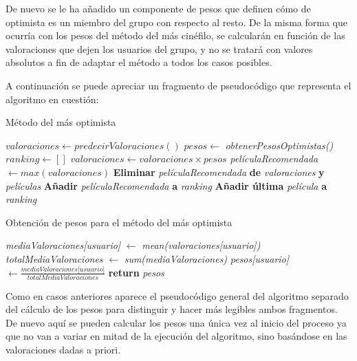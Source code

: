 De nuevo se le ha añadido un componente de pesos que definen cómo de optimista es un miembro del grupo con respecto al resto. De la misma forma que ocurría con los pesos del método del más cinéfilo, se calcularán en función de las valoraciones que dejen los usuarios del grupo, y no se tratará con valores absolutos a fin de adaptar el método a todos los casos posibles.

A continuación se puede apreciar un fragmento de pseudocódigo que representa el algoritmo en cuestión:
\newpage

\begin{algorithm}
	\caption{Método del más optimista}
	\begin{algorithmic}[1]
		\State $valoraciones \gets predecirValoraciones()$
		\State $pesos \gets $ \textit{obtenerPesosOptimistas()}
		\State $ranking \gets []$
		\State $valoraciones \gets valoraciones \times pesos$
		\State \textit{películaRecomendada} $ \gets max(valoraciones)$
		\State \textbf{Eliminar} \textit{películaRecomendada} \textbf{de} \textit{valoraciones} \textbf{y} \textit{películas}
		\State \textbf{Añadir} \textit{películaRecomendada} \textbf{a} \textit{ranking}
		\EndWhile
		\State \textbf{Añadir última} \textit{película} \textbf{a} \textit{ranking}
	\end{algorithmic}
\end{algorithm}

\begin{algorithm}
	\caption{Obtención de pesos para el método del más optimista}
	\begin{algorithmic}[1]
		\State \textit{mediaValoraciones[usuario]} $\gets$ \textit{mean(valoraciones[usuario])} 
		\EndFor
		\State \textit{totalMediaValoraciones} $\gets$ \textit{sum(mediaValoraciones)}
		\State \textit{pesos[usuario]} $\gets \frac{\textit{mediaValoraciones[usuario]}}{\textit{totalMediaValoraciones}}$
		\EndFor
		\State \textbf{return} \textit{pesos}
	\end{algorithmic}
\end{algorithm}

Como en casos anteriores aparece el pseudocódigo general del algoritmo separado del cálculo de los pesos para distinguir y hacer más legibles ambos fragmentos. De nuevo aquí se pueden calcular los pesos una única vez al inicio del proceso ya que no van a variar en mitad de la ejecución del algoritmo, sino basándose en las valoraciones dadas a priori.

